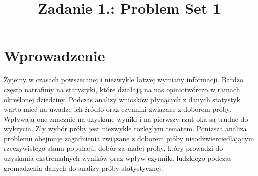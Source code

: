 \documentclass{classrep}
\author{%
    \studentinfo[239673@edu.p.lodz.pl]{Michał Kidawa}{239673}
}
\title{Zadanie 1.: Problem Set 1}
\begin{document}
    \maketitle
    \thispagestyle{fancyplain}

    \section{Wprowadzenie}
    \label{intro} {
        Żyjemy w czasach powszechnej i niezwykle łatwej wymiany informacji. Bardzo często natrafimy na statystyki, które działają na nas opiniotwórczo w ramach określonej dziedziny. Podczas analizy wniosków płynących z danych statystyk warto mieć na uwadze ich źródło oraz czynniki związane z doborem próby. Wpływają one znacznie na uzyskane wyniki i na pierwszy rzut oka są trudne do wykrycia. Zły wybór próby jest niezwykle rozległym tematem. Poniższa analiza problemu obejmuje zagadnienia związane z doborem próby nieodzwierciedlającym rzeczywistego stanu populacji, dobór za małej próby, który prowadzi do uzyskania ekstremalnych wyników oraz wpływ czynnika ludzkiego podczas gromadzenia danych do analizy próby statystycznej.
    }
\end{document}
